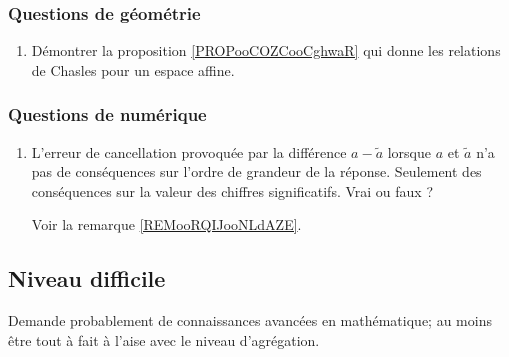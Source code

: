 \subsubsection{Questions de géométrie}

\begin{enumerate}
    \item
        Démontrer la proposition \ref{PROPooCOZCooCghwaR} qui donne les relations de Chasles pour un espace affine.
\end{enumerate}

\subsubsection{Questions de numérique}

\begin{enumerate}
    \item
        L'erreur de cancellation provoquée par la différence \( a-\tilde a\) lorsque \( a\) et \( \tilde a\) n'a pas de conséquences sur l'ordre de grandeur de la réponse. Seulement des conséquences sur la valeur des chiffres significatifs. Vrai ou faux ?

        Voir la remarque \ref{REMooRQIJooNLdAZE}.
\end{enumerate}

\subsection{Niveau difficile}

Demande probablement de connaissances avancées en mathématique; au moins être tout à fait à l'aise avec le niveau d'agrégation.

